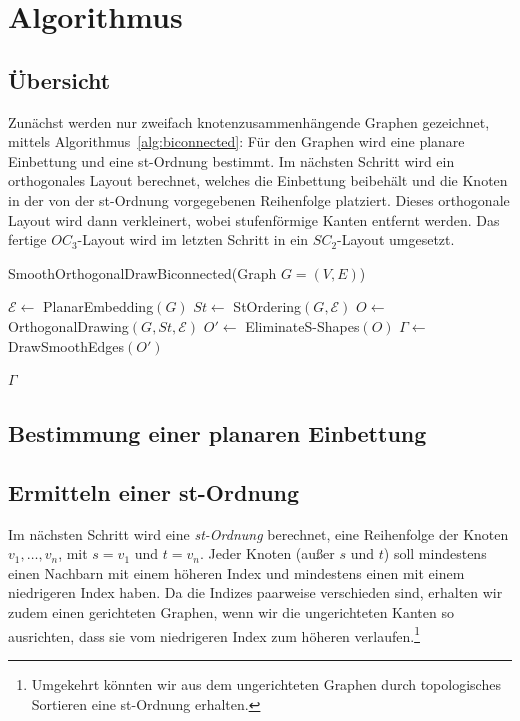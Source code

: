 \documentclass[a4paper]{scrreprt}
\theoremstyle{definition}
\newcommand{\Epsilon}{\mathcal{E}}
\begin{document}
\chapter{Algorithmus}

\section{Übersicht}

Zunächst werden nur zweifach knotenzusammenhängende Graphen gezeichnet, mittels Algorithmus~\ref{alg:biconnected}: Für den Graphen wird eine planare Einbettung und eine st-Ordnung bestimmt. Im nächsten Schritt wird ein orthogonales Layout berechnet, welches die Einbettung beibehält und die Knoten in der von der st-Ordnung vorgegebenen Reihenfolge platziert. Dieses orthogonale Layout wird dann verkleinert, wobei stufenförmige Kanten entfernt werden. Das fertige $OC_3$-Layout wird im letzten Schritt in ein $SC_2$-Layout umgesetzt.

\begin{algorithm}[ht]
  \caption{SmoothOrthogonalDrawBiconnected(Graph $G = (V,E)$)}
  \label{alg:biconnected}
  
  $\Epsilon \leftarrow$ PlanarEmbedding$(G)$ \;
  $St \leftarrow$ StOrdering$(G, \Epsilon)$ \;
  $O \leftarrow$ OrthogonalDrawing$(G,St,\Epsilon)$ \;
  $O' \leftarrow$ EliminateS-Shapes$(O)$ \;
  $\Gamma \leftarrow$ DrawSmoothEdges$(O')$ \;
  
  \Return $\Gamma$
\end{algorithm}


\section{Bestimmung einer planaren Einbettung}


\cite{hopcroft+tarjan-74} \cite{patrignani-07} \cite{brandes-09}


\section{Ermitteln einer st-Ordnung}

Im nächsten Schritt wird eine \emph{st-Ordnung} berechnet, eine Reihenfolge der Knoten $v_1, \dots, v_n$, mit $s=v_1$ und $t=v_n$. Jeder Knoten (außer $s$ und $t$) soll mindestens einen Nachbarn mit einem höheren Index und mindestens einen mit einem niedrigeren Index haben. Da die Indizes paarweise verschieden sind, erhalten wir zudem einen gerichteten Graphen, wenn wir die ungerichteten Kanten so ausrichten, dass sie vom niedrigeren Index zum höheren verlaufen.\footnote {Umgekehrt könnten wir aus dem ungerichteten Graphen durch topologisches Sortieren eine st-Ordnung erhalten.}
\end{document}
